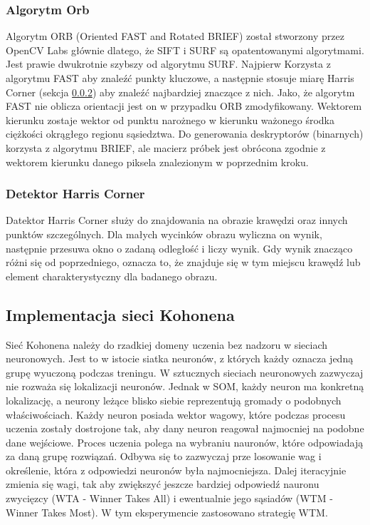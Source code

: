 \documentclass[12pt, notitlepage]{article}
\begin{document}
\subsubsection{Algorytm Orb}

Algorytm ORB (Oriented FAST and Rotated BRIEF) został stworzony przez OpenCV Labs głównie dlatego, że SIFT i SURF są opatentowanymi algorytmami. Jest prawie dwukrotnie szybszy od algorytmu SURF. Najpierw Korzysta z algorytmu FAST\cite{fast} aby znaleźć punkty kluczowe, a następnie stosuje miarę Harris Corner (sekcja \ref{sec:harris}) aby znaleźć najbardziej znaczące z nich. Jako, że algorytm FAST nie oblicza orientacji jest on w przypadku ORB zmodyfikowany. Wektorem kierunku zostaje wektor od punktu narożnego w kierunku ważonego środka ciężkości okrągłego regionu sąsiedztwa. Do generowania deskryptorów (binarnych) korzysta z algorytmu BRIEF\cite{brief}, ale macierz próbek jest obrócona zgodnie z wektorem kierunku danego piksela znalezionym w poprzednim kroku.

\subsubsection{Detektor Harris Corner} \label{sec:harris}

Datektor Harris Corner\cite{harris_corner} służy do znajdowania na obrazie krawędzi oraz innych punktów szczególnych. Dla małych wycinków obrazu wyliczna on wynik, następnie przesuwa okno o zadaną odległość i liczy wynik. Gdy wynik znacząco różni się od poprzedniego, oznacza to, że znajduje się w tym miejscu krawędź lub element charakterystyczny dla badanego obrazu.

\subsection{Implementacja sieci Kohonena}

Sieć Kohonena należy do rzadkiej domeny uczenia bez nadzoru w sieciach neuronowych. Jest to w istocie siatka neuronów, z których każdy oznacza jedną grupę wyuczoną podczas treningu. W sztucznych sieciach neuronowych zazwyczaj nie rozważa się lokalizacji neuronów. Jednak w SOM, każdy neuron ma konkretną lokalizację, a neurony leżące blisko siebie reprezentują gromady o podobnych właściwościach. Każdy neuron posiada wektor wagowy, które podczas procesu uczenia zostały dostrojone tak, aby dany neuron reagował najmocniej na podobne dane wejściowe. Proces uczenia polega na wybraniu nauronów, które odpowiadają za daną grupę rozwiązań. Odbywa się to zazwyczaj prze losowanie wag i określenie, która z odpowiedzi neuronów była najmocniejsza. Dalej iteracyjnie zmienia się wagi, tak aby zwiększyć jeszcze bardziej odpowiedź nauronu zwycięzcy (WTA - Winner Takes All) i ewentualnie jego sąsiadów (WTM - Winner Takes Most). W tym eksperymencie zastosowano strategię WTM.
\end{document}
